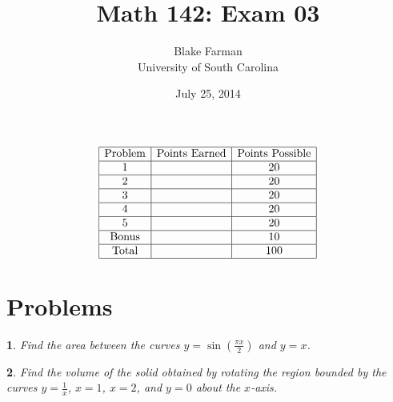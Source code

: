 \documentclass[12pt]{amsart}
\author{Blake Farman\\University of South Carolina}
\title{Math 142: Exam 03}
\date{July 25, 2014}
\begin{document}
\maketitle

\begin{center}
\end{center}

\vspace{0.2in}
\vspace{0.2in}

$$
\begin{array}{|c|c|c|}
  \hline
  \text{Problem} & \text{Points Earned} & \text{Points Possible}\\
  \hline
  1 & & 20\\
  \hline
  2 & & 20\\
  \hline
  3 & & 20\\
  \hline
  4 & & 20\\
  \hline
  5 & & 20 \\
  \hline
  \text{Bonus} & & 10\\
  \hline
  \text{Total} & & 100\\
  \hline
\end{array}
$$

\newpage

\theoremstyle{plain}
\newtheorem{thm}{}
\newtheorem{lem}{Lemma}
\theoremstyle{definition}
\newtheorem{defn}{Definition}

\section{Problems}

\begin{thm}
Find the area between the curves $\displaystyle{y = \sin\left(\frac{\pi x}{2}\right)}$ and $\displaystyle{y = x}$.
\end{thm}

\newpage

\begin{thm}
  Find the volume of the solid obtained by rotating the region bounded by the curves $\displaystyle{y = \frac{1}{x}}$, $\displaystyle{x = 1}$, $\displaystyle{x = 2}$, and $\displaystyle{y = 0}$ about the $x$-axis.
\end{thm}
\end{document}
